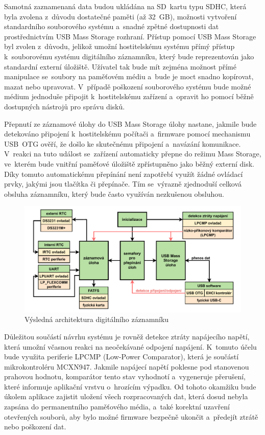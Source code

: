 Samotná zaznamenaná data budou ukládána na SD~kartu typu SDHC, která byla zvolena z~důvodu dostatečné paměti (až 32~GB), možnosti vytvoření standardního souborového systému a~snadné zpětné dostupnosti dat prostřednictvím USB Mass Storage rozhraní. Přístup pomocí USB Mass Storage byl zvolen z~důvodu, jelikož umožní hostitelskému systému přímý přístup k~souborovému systému digitálního záznamníku, který bude reprezentován jako standardní externí úložiště. Užívatel tak bude mít zejména možnost přímé manipulace se~soubory na paměťovém médiu a~bude je moct snadno kopírovat, mazat nebo upravovat. V~případě poškození souborového systému bude možné médium jednoduše připojit k~hostitelskému zařízení a~opravit ho pomocí běžně dostupných nástrojů pro správu disků.

Přepnutí ze záznamové úlohy do USB Mass Storage úlohy nastane, jakmile bude detekováno připojení k~hostitelskému počítači a~firmware pomocí mechanismu USB~OTG ověří, že došlo ke skutečnému připojení a~navázání komunikace. V~reakci na tuto událost se~zařízení automaticky přepne do režimu Mass Storage, ve~kterém bude vnitřní paměťové úložiště zpřístupněno jako běžný externí disk. Díky tomuto automatickému přepínání není zapotřebí využít žádné ovládací prvky, jakými jsou tlačítka či přepínače. Tím se~výrazně zjednoduší celková obsluha záznamníku, který bude často využíván nezkušenou obsluhou.

\begin{figure}[h]
    \centering
    \includegraphics[width=1.00\textwidth]{obrazky-figures/system_architecture.pdf}
    
    \caption{Výsledná architektura digitálního záznamníku}
    \label{fig:system-architecture}
\end{figure}


Důležitou součástí návrhu systému je rovněž detekce ztráty napájecího napětí, která umožní včasnou reakci na neočekávané odpojení napájení. K~tomuto účelu bude využita periferie LPCMP (Low-Power Comparator), která je součástí mikrokontroléru MCXN947. Jakmile napájecí napětí poklesne pod stanovenou prahovou hodnotu, komparátor tento stav vyhodnotí a~vygeneruje přerušení, které informuje aplikační vrstvu o~hrozícím výpadku. Od tohoto okamžiku bude úkolem aplikace zajistit uložení všech rozpracovaných dat, která dosud nebyla zapsána do permanentního paměťového média, a~také korektní uzavření otevřených souborů, aby bylo možné firmware bezpečně ukončit a~předejít ztrátě nebo poškození dat.



